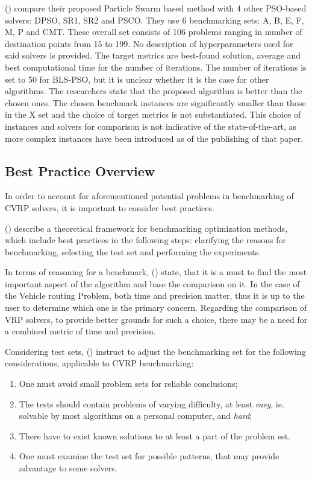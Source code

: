 \documentclass[a4paper,12pt]{report}
\begin{document}
{ (\citeyear{ahmedBilayer}) compare their proposed Particle Swarm based method with 4 other PSO-based solvers: DPSO, SR1, SR2 and PSCO. They use 6 benchmarking sets: A, B, E, F, M, P and CMT. These overall set consists of 106 problems ranging in number of destination points from 15 to 199. No description of hyperparameters used for said solvers is provided. The target metrics are best-found solution, average and best computational time for the number of iterations. The number of iterations is set to 50 for BLS-PSO, but it is unclear whether it is the case for other algorithms. The researchers state that the proposed algorithm is better than the chosen ones. The chosen benchmark instances are significantly smaller than those in the X set and the choice of target metrics is not substantiated. This choice of instances and solvers for comparison is not indicative of the state-of-the-art, as more complex instances have been introduced as of the publishing of that paper.

\subsection{Best Practice Overview}

In order to account for aforementioned potential problems in benchmarking of CVRP solvers, it is important to consider best practices.

 (\citeyear{beiranvandBest}) describe a theoretical framework for benchmarking optimization methods, which include best practices in the following steps: clarifying the reasons for benchmarking, selecting the test set and performing the experiments.

In terms of reasoning for a benchmark,  (\citeyear{beiranvandBest}) state, that it is a must to find the most important aspect of the algorithm and base the comparison on it. In the case of the Vehicle routing Problem, both time and precision matter, thus it is up to the user to determine which one is the primary concern. Regarding the comparison of VRP solvers, to provide better grounds for such a choice, there may be a need for a combined metric of time and precision.

Considering test sets,  (\citeyear{beiranvandBest}) instruct to adjust the benchmarking set for the following considerations, applicable to CVRP benchmarking:

\begin{enumerate}
    \item One must avoid small problem sets for reliable conclusions;
    \item The tests should contain problems of varying difficulty, at least \emph{easy}, ie. solvable by most algorithms on a personal computer, and \emph{hard};
    \item There have to exist known solutions to at least a part of the problem set.
    \item One must examine the test set for possible patterns, that may provide advantage to some solvers.
\end{enumerate}

}
\end{document}
